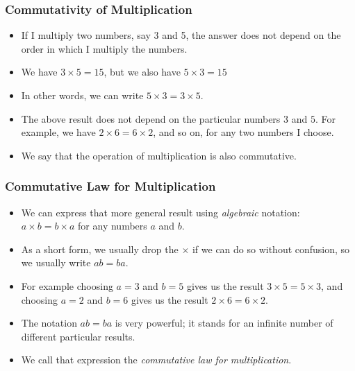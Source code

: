 \documentclass[serif,ignorenonframetext]{beamer}
\begin{document}
\begin{frame}
  \frametitle{Commutativity of Multiplication}
  \begin{itemize}[<+->]
  \item If I multiply two numbers, say 3 and 5, the answer does not depend
    on the order in which I multiply the numbers.
  \item We have $3\times 5=15$, but we also have $5\times 3=15$
  \item In other words, we can write $5\times 3 = 3\times 5$.
  \item The above result does not depend on the particular numbers $3$
    and $5$.  For example, we have $2\times 6=6\times 2$, and so on,
    for any two numbers I choose.
  \item We say that the operation of multiplication is also commutative.
  \end{itemize}
\end{frame}

\begin{frame}
  \frametitle{Commutative Law for Multiplication}
  \begin{itemize}[<+->]
  \item We can express that more general result using \textit{algebraic}
    notation: $a\times b=b\times a$ for any numbers $a$ and $b$.
  \item As a short form, we usually drop the $\times$ if we can do so without
    confusion, so we usually write $ab=ba$.
  \item For example choosing $a=3$ and $b=5$ gives us the result $3\times 5
    =5\times 3$,
    and choosing $a=2$ and $b=6$ gives us the result $2\times 6=6\times 2$.
  \item The notation $ab=ba$ is very powerful; it stands for an infinite
    number of different particular results.
  \item We call that expression the \textit{commutative law for
    multiplication}.
  \end{itemize}
\end{frame}
\end{document}
